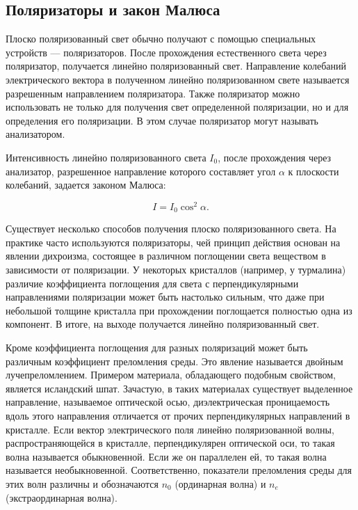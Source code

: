 \documentclass[a4paper,14pt]{extarticle}
\begin{document}
			\subsection{Поляризаторы и закон Малюса}
			Плоско поляризованный свет обычно получают с помощью специальных устройств — поляризаторов. После прохождения естественного света через поляризатор, получается линейно поляризованный свет. Направление колебаний электрического вектора в полученном линейно поляризованном свете называется разрешенным направлением поляризатора. Также поляризатор можно использовать не только для получения свет	определенной поляризации, но и для определения его поляризации. В этом случае поляризатор могут называть анализатором. 
			
			Интенсивность линейно поляризованного света $I_0$, после прохождения через анализатор, разрешенное направление которого составляет угол $\alpha$ к плоскости колебаний, задается законом Малюса:
			
			\begin{equation}
				I = I_0 \cos^2{\alpha}.
			\end{equation}
			
			Существует несколько способов получения плоско поляризованного света. На практике часто используются поляризаторы, чей принцип действия основан на явлении дихроизма, состоящее в различном поглощении света веществом в зависимости от поляризации. У некоторых кристаллов (например, у турмалина) различие коэффициента поглощения для света с перпендикулярными направлениями поляризации может быть настолько сильным, что даже при небольшой толщине кристалла при прохождении поглощается полностью одна из компонент. В итоге, на выходе получается линейно поляризованный свет.
			
			Кроме коэффициента поглощения для разных поляризаций может быть различным коэффициент преломления среды. Это явление называется двойным лучепреломлением. Примером материала, обладающего подобным свойством, является исландский шпат. Зачастую, в таких материалах существует выделенное направление, называемое	оптической осью, диэлектрическая проницаемость вдоль этого направления отличается от прочих перпендикулярных направлений в кристалле. Если вектор электрического поля линейно поляризованной волны, распространяющейся в кристалле, перпендикулярен оптической оси, то такая волна называется обыкновенной. Если же он параллелен ей, то такая волна называется необыкновенной. Соответственно, показатели преломления среды для этих волн различны и обозначаются $n_0$ (ординарная волна) и $n_e$ (экстраординарная волна).
			
\end{document}

